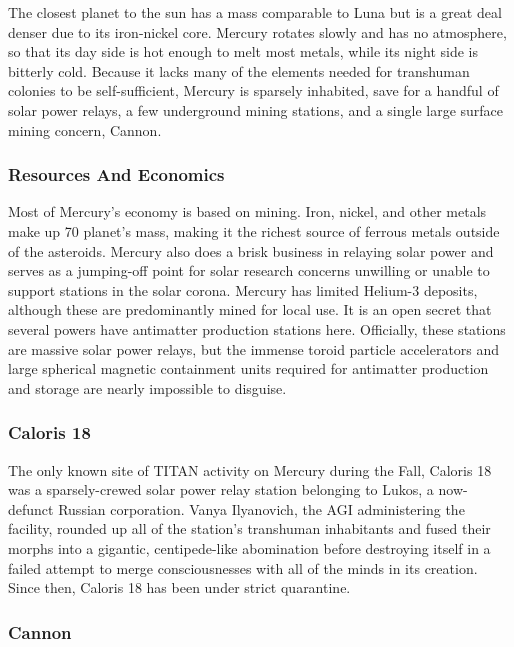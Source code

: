 The closest planet to the sun has a mass comparable 
to Luna but is a great deal denser due to its iron-nickel 
core. Mercury rotates slowly and has no atmosphere, 
so that its day side is hot enough to melt most metals, 
while its night side is bitterly cold. Because it lacks 
many of the elements needed for transhuman colonies 
to be self-sufficient, Mercury is sparsely inhabited, 
save for a handful of solar power relays, a few underground mining stations, and a single large surface 
mining concern, Cannon.

\subsubsection{Resources And Economics}

Most of Mercury's economy is based on mining. 
Iron, nickel, and other metals make up 70%
planet's mass, making it the richest source of ferrous 
metals outside of the asteroids. Mercury also does a 
brisk business in relaying solar power and serves as a 
jumping-off point for solar research concerns unwilling or unable to support stations in the solar corona. 
Mercury has limited Helium-3 deposits, although these 
are predominantly mined for local use. It is an open 
secret that several powers have antimatter production 
stations here. Officially, these stations are massive 
solar power relays, but the immense toroid particle 
accelerators and large spherical magnetic containment 
units required for antimatter production and storage 
are nearly impossible to disguise.

\subsubsection{Caloris 18}

The only known site of TITAN activity on Mercury 
during the Fall, Caloris 18 was a sparsely-crewed solar 
power relay station belonging to Lukos, a now-defunct 
Russian corporation. Vanya Ilyanovich, the AGI administering the facility, rounded up all of the station's 
transhuman inhabitants and fused their morphs into a 
gigantic, centipede-like abomination before destroying 
itself in a failed attempt to merge consciousnesses with 
all of the minds in its creation. Since then, Caloris 18 
has been under strict quarantine.

\subsubsection{Cannon}

